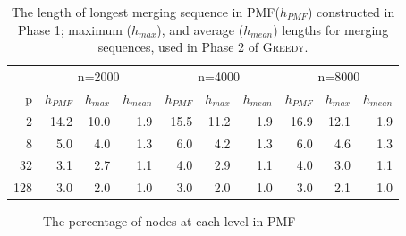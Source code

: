 \documentclass[12pt]{article}
\newcommand{\comment}[2]{{\color{red}{\bf (#1: #2)}}}
\newcommand{\greedyAlgo}{\textsc{Greedy}}
\begin{document}
\begin{table}
\center
\begin{tabular}{r|rrr|rrr|rrr}
 & \multicolumn{3}{c|}{n=2000} & \multicolumn{3}{c|}{n=4000} & \multicolumn{3}{c}{n=8000} \\
p &  $h_{PMF}$ &  $h_{max}$ &  $h_{mean}$ &  $h_{PMF}$ &  $h_{max}$ &  $h_{mean}$ &  $h_{PMF}$ &  $h_{max}$ &  $h_{mean}$ \\ \hline
 2 &  14.2 &  10.0 &  1.9 &  15.5 &  11.2 &  1.9 &  16.9 &  12.1 &  1.9 \\
 8 &  5.0 &  4.0 &  1.3 &  6.0 &  4.2 &  1.3 &  6.0 &  4.6 &  1.3 \\
 32 &  3.1 &  2.7 &  1.1 &  4.0 &  2.9 &  1.1 &  4.0 &  3.0 &  1.1 \\
 128 &  3.0 &  2.0 &  1.0 &  3.0 &  2.0 &  1.0 &  3.0 &  2.1 &  1.0
\end{tabular}
\caption{The length of longest merging sequence in PMF($h_{PMF}$) constructed in Phase 1; maximum ($h_{max}$), and average ($h_{mean}$) lengths for merging sequences, used in Phase 2 of \greedyAlgo. \comment{sertac}{cerny deneyleri}}
\label{table:levels}
\end{table}

\begin{figure}
	\centering
	\caption{The percentage of nodes at each level in PMF \comment{sertac}{distance yerine length yazmak lazim. Daha okunabilir ve diger graphlerle uyumlu bir halini yapmak icin graphlerin exceldeki hallerini bulmam lazim}}
	\label{fig:nodes-at-levels}
	\vspace*{-2.5ex}
\end{figure}
\end{document}
